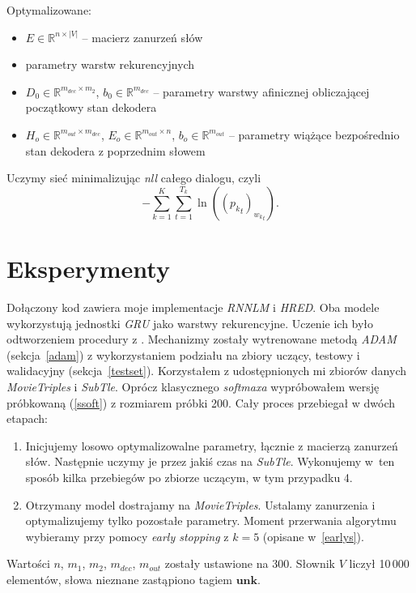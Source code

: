 Optymalizowane:\vspace{-.3cm}
\begin{itemize}[leftmargin=1.5cm,label={\tiny$\bullet$}]
    \itemsep0em
    \item $E \in \mathbb{R}^{n \times |V|}$ -- macierz zanurzeń słów
    \item parametry warstw rekurencyjnych
    \item $D_0 \in \mathbb{R}^{m_{dec} \times m_2}$, $b_0 \in \mathbb{R}^{m_{dec}}$ -- parametry warstwy afinicznej obliczającej początkowy stan dekodera
    \item $H_o \in \mathbb{R}^{m_{out} \times m_{dec}}$, $E_o \in \mathbb{R}^{m_{out} \times n}$, $b_o \in \mathbb{R}^{m_{out}}$ -- parametry wiążące bezpośrednio stan dekodera z poprzednim słowem
\end{itemize}
\noindent
Uczymy sieć minimalizując \textit{nll} całego dialogu, czyli
\[-\sum\limits_{k=1}^K \sum\limits_{t=1}^{T_k} \ln(({p_k}_t)_{{w_k}_t}).\]


\section{Eksperymenty}
Dołączony kod zawiera moje implementacje \textit{RNNLM} i \textit{HRED}. Oba modele wykorzystują jednostki \textit{GRU} jako warstwy rekurencyjne. Uczenie ich było odtworzeniem procedury z \cite{serbanhred}. Mechanizmy zostały wytrenowane metodą \textit{ADAM} (sekcja~\ref{adam}) z wykorzystaniem podziału na zbiory uczący, testowy i walidacyjny (sekcja~\ref{testset}). Korzystałem z udostępnionych mi zbiorów danych \textit{MovieTriples} i \textit{SubTle}. Oprócz klasycznego \textit{softmaxa} wypróbowałem wersję próbkowaną (\ref{ssoft}) z rozmiarem próbki 200. Cały proces przebiegał w dwóch etapach:

\begin{enumerate}
    \item Inicjujemy losowo optymalizowalne parametry, łącznie z macierzą zanurzeń słów. Następnie uczymy je przez jakiś czas na \textit{SubTle}. Wykonujemy w~ten sposób kilka przebiegów po zbiorze uczącym, w tym przypadku 4.
    \item Otrzymany model dostrajamy na \textit{MovieTriples}. Ustalamy zanurzenia i optymalizujemy tylko pozostałe parametry. Moment przerwania algorytmu wybieramy przy pomocy \textit{early stopping} z $k=5$ (opisane w~\ref{earlys}).
\end{enumerate}
\noindent
Wartości $n$, $m_1$, $m_2$, $m_{dec}$, $m_{out}$ zostały ustawione na 300. Słownik $V$ liczył 10\,000 elementów, słowa nieznane zastąpiono tagiem $\mathbf{unk}$.

